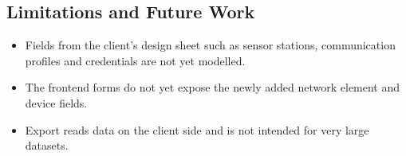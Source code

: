 \subsection{Limitations and Future Work}
\begin{itemize}
  \item Fields from the client's design sheet such as sensor stations, communication profiles and credentials are not yet modelled.
  \item The frontend forms do not yet expose the newly added network element and device fields.
  \item Export reads data on the client side and is not intended for very large datasets.
\end{itemize}
